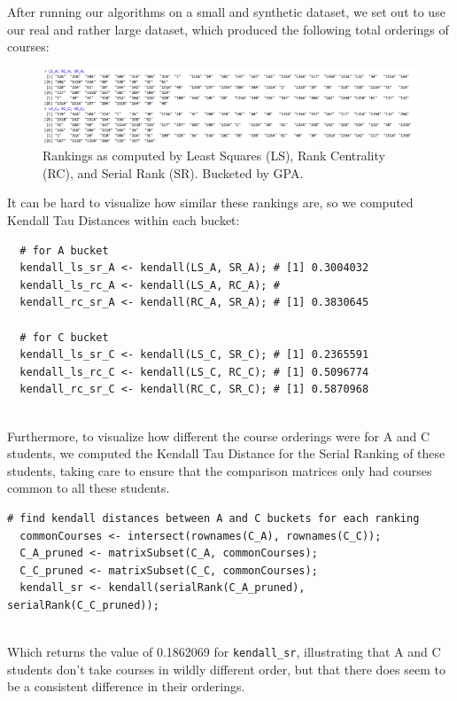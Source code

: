 \documentclass[10pt]{siamltex}
\begin{document}
\begin{pagewiselinenumbers}
After running our algorithms on a small and synthetic dataset, we set out to use our real and rather large dataset, which produced the following total orderings of courses:

\begin{figure}[H]
\includegraphics[width=6.5in]{rankings}
\caption{Rankings as computed by Least Squares (LS), Rank Centrality (RC), and Serial Rank (SR). Bucketed by GPA.}
\end{figure}

It can be hard to visualize how similar these rankings are, so we computed Kendall Tau Distances within each bucket:\\

\begin{verbatim}
  # for A bucket
  kendall_ls_sr_A <- kendall(LS_A, SR_A); # [1] 0.3004032
  kendall_ls_rc_A <- kendall(LS_A, RC_A); #
  kendall_rc_sr_A <- kendall(RC_A, SR_A); # [1] 0.3830645
  
  # for C bucket
  kendall_ls_sr_C <- kendall(LS_C, SR_C); # [1] 0.2365591
  kendall_ls_rc_C <- kendall(LS_C, RC_C); # [1] 0.5096774
  kendall_rc_sr_C <- kendall(RC_C, SR_C); # [1] 0.5870968
\end{verbatim}
\textcolor{white}{.}\\
Furthermore, to visualize how different the course orderings were for A and C students, we computed the Kendall Tau Distance for the Serial Ranking of these students, taking care to ensure that the comparison matrices only had courses common to all these students.\\

\begin{verbatim}
# find kendall distances between A and C buckets for each ranking
  commonCourses <- intersect(rownames(C_A), rownames(C_C));
  C_A_pruned <- matrixSubset(C_A, commonCourses);
  C_C_pruned <- matrixSubset(C_C, commonCourses);
  kendall_sr <- kendall(serialRank(C_A_pruned), serialRank(C_C_pruned));
\end{verbatim}
\textcolor{white}{.}\\
Which returns the value of 0.1862069 for \texttt{kendall\_sr}, illustrating that A and C students don't take courses in wildly different order, but that there does seem to be a consistent difference in their orderings.


\end{pagewiselinenumbers}
\end{document}
